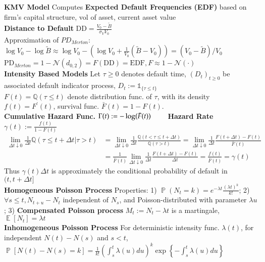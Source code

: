 \documentclass[12pt,landscape, a4paper]{article}
\theoremstyle{remark}
\newcommand{\E}{\operatorname{\mathbb{E}}}
\newcommand{\prob}{\operatorname{\mathbb{P}}}
\newcommand{\PD}{\mathrm{PD}}
\newcommand{\N}{\mathcal{N}}
\newcommand{\Q}{\mathbb{Q}}
\begin{document}
\begin{multicols*}{3}
\textbf{KMV Model} Computes \textbf{Expected Default Frequencies (EDF)} based on firm's capital structure, vol of asset, current asset value\\
\textbf{Distance to Default} $\mathrm{DD} = \frac{V_0 - \tilde{B}}{\sigma_V V_0}$\\
Approximation of $PD_{Merton}$: $\log V_0 - \log \tilde{B} \approx \log V_0 - \left(\log V_0 + \frac{1}{V_0} (\tilde{B} - V_0) \right) = (V_0 - \tilde{B}) / V_0$\\
$\PD_{Merton} = 1 - \N (d_{0, 2}) = F(\mathrm{DD}) = \mathrm{EDF}, F \approx 1 - \N (\cdot)$\\

\textbf{Intensity Based Models} Let $\tau \geq 0$ denotes default time, $(D_t)_{t\geq 0}$ be associated default indicator process, $D_t := \mathds{1}_{\{\tau \leq t \}}$\\

$F(t) = \Q (\tau \leq t)$ denote distribution func. of $\tau$, with its density $f(t) = F^\prime (t)$, survival func. $\bar{F} (t) = 1 - F(t)$.\\
\textbf{Cumulative Hazard Func.} $\Gamma (t) := - \log (\Bar{F} (t))\qquad$
\textbf{Hazard Rate} $\gamma (t) := \frac{f(t)}{ 1 - F(t)}$
\begin{align*}
    \lim_{\Delta t\downarrow 0} \frac{1}{\Delta t} \Q (\tau \leq t + \Delta t \lvert \tau > t) &= \lim_{\Delta t\downarrow 0}\frac{1}{\Delta t} \frac{\Q (t < \tau  \leq t + \Delta t)}{\Q (\tau > t)} = \lim_{\Delta t\downarrow 0}\frac{1}{\Delta t} \frac{F (t+\Delta t) - F(t)}{\bar{F} (t)} \\
    &=\frac{1}{\bar{F}(t)} \lim_{\Delta t\downarrow 0}\frac{1}{\Delta t} \frac{F (t+\Delta t) - F(t)}{\Delta t} = \frac{f(t)}{\bar{F} (t)} = \gamma (t)
\end{align*}
Thus $\gamma (t) \Delta t$ is approximately the conditional probability of default in $(t, t +\Delta t]$\\

\textbf{Homogeneous Poisson Process} Properties: 1) $\prob (N_t = k) = e^{-\lambda t} \frac{(\lambda t)^k}{k!} $; 2) $\forall s\leq t, N_{t+u} - N_t$ independent of $N_s$, and Poisson-distributed with parameter $\lambda u$; 3) \textbf{Compensated Poisson process} $M_t := N_t - \lambda t$ is a martingale, $\E [N_t] = \lambda t$\\

\textbf{Inhomogeneous Poisson Process} For deterministic intensity func. $\lambda (t)$, for independent $N(t) - N(s)$ and $s<t$, $\prob [N(t) - N (s) = k] = \frac{1}{k!} \left(\int^t_s \lambda (u) du \right)^k \exp \left\{-\int^t_s \lambda(u) du \right\}$\\


\end{multicols*}
\end{document}

